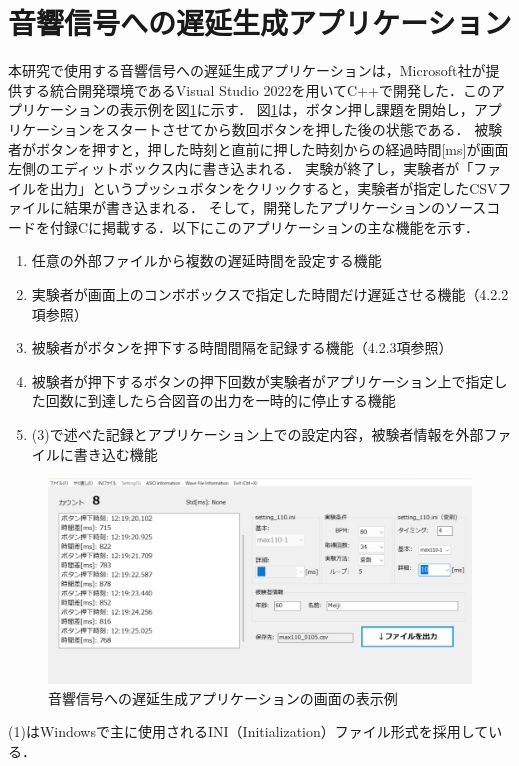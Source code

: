 \section{音響信号への遅延生成アプリケーション}
本研究で使用する音響信号への遅延生成アプリケーションは，Microsoft社が提供する統合開発環境であるVisual Studio 2022を用いてC++で開発した．このアプリケーションの表示例を図\ref{fig:app_kyakkann}に示す．
図\ref{fig:app_kyakkann}は，ボタン押し課題を開始し，アプリケーションをスタートさせてから数回ボタンを押した後の状態である．
被験者がボタンを押すと，押した時刻と直前に押した時刻からの経過時間[ms]が画面左側のエディットボックス内に書き込まれる．
実験が終了し，実験者が「ファイルを出力」というプッシュボタンをクリックすると，実験者が指定したCSVファイルに結果が書き込まれる．
そして，開発したアプリケーションのソースコードを付録Cに掲載する．以下にこのアプリケーションの主な機能を示す．
\begin{enumerate}[leftmargin=*]
\item 任意の外部ファイルから複数の遅延時間を設定する機能
\item 実験者が画面上のコンボボックスで指定した時間だけ遅延させる機能（4.2.2項参照）
\item 被験者がボタンを押下する時間間隔を記録する機能（4.2.3項参照）
\item 被験者が押下するボタンの押下回数が実験者がアプリケーション上で指定した回数に到達したら合図音の出力を一時的に停止する機能
\item (3)で述べた記録とアプリケーション上での設定内容，被験者情報を外部ファイルに書き込む機能
\end{enumerate}
\begin{figure}[tb]
  \centering
  \includegraphics[scale=0.4]{figures/Apprication/App_kyakkann.pdf}
  \caption{音響信号への遅延生成アプリケーションの画面の表示例}
  \label{fig:app_kyakkann}
\end{figure}
(1)はWindowsで主に使用されるINI（Initialization）ファイル形式を採用している．
